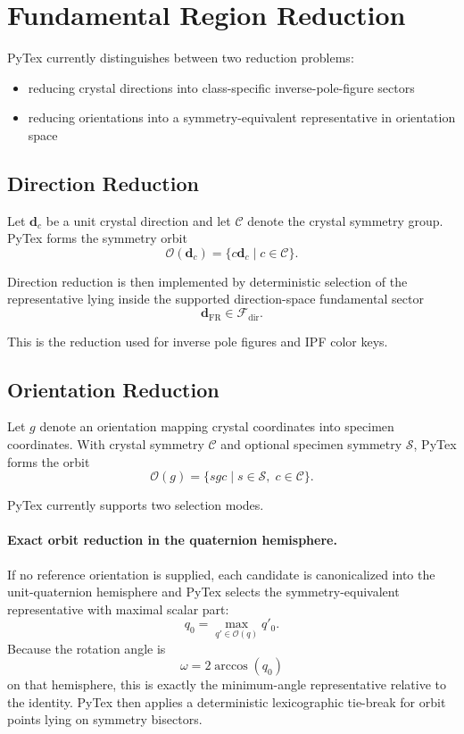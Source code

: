 \section{Fundamental Region Reduction}

PyTex currently distinguishes between two reduction problems:

\begin{itemize}
  \item reducing crystal directions into class-specific inverse-pole-figure sectors
  \item reducing orientations into a symmetry-equivalent representative in orientation space
\end{itemize}

\subsection{Direction Reduction}

Let \(\mathbf{d}_c\) be a unit crystal direction and let \(\mathcal{C}\) denote the crystal symmetry group. PyTex forms the symmetry orbit
\[
  \mathcal{O}(\mathbf{d}_c) = \{ c \mathbf{d}_c \; | \; c \in \mathcal{C} \}.
\]

Direction reduction is then implemented by deterministic selection of the representative lying inside the supported direction-space fundamental sector
\[
  \mathbf{d}_{\mathrm{FR}} \in \mathcal{F}_{\mathrm{dir}}.
\]

This is the reduction used for inverse pole figures and IPF color keys.

\subsection{Orientation Reduction}

Let \(g\) denote an orientation mapping crystal coordinates into specimen coordinates. With crystal symmetry \(\mathcal{C}\) and optional specimen symmetry \(\mathcal{S}\), PyTex forms the orbit
\[
  \mathcal{O}(g) = \{ s g c \; | \; s \in \mathcal{S},\; c \in \mathcal{C} \}.
\]

PyTex currently supports two selection modes.

\paragraph{Exact orbit reduction in the quaternion hemisphere.}
If no reference orientation is supplied, each candidate is canonicalized into the unit-quaternion hemisphere and PyTex selects the symmetry-equivalent representative with maximal scalar part:
\[
  q_0 = \max_{q' \in \mathcal{O}(q)} q'_0.
\]
Because the rotation angle is
\[
  \omega = 2 \arccos(q_0)
\]
on that hemisphere, this is exactly the minimum-angle representative relative to the identity. PyTex then applies a deterministic lexicographic tie-break for orbit points lying on symmetry bisectors.

